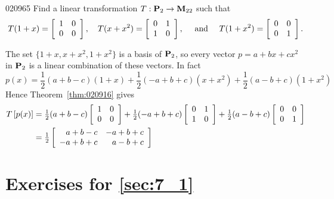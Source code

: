 \begin{example}{}{020965}
Find a linear transformation $T : \textbf{P}_{2} \to \textbf{M}_{22}$ such that
\begin{equation*}
T(1 + x) = \left[ \begin{array}{rr}
1 & 0 \\
0 & 0
\end{array} \right], \quad
T(x + x^2) = \left[ \begin{array}{rr}
0 & 1 \\
1 & 0
\end{array} \right], \quad \mbox{ and } \quad
T(1 + x^2) = \left[ \begin{array}{rr}
0 & 0 \\
0 & 1
\end{array} \right].
\end{equation*}
\vspace*{-1em}
\begin{solution}
 The set $\{1 + x, x + x^{2}, 1 + x^{2}\}$ is a basis of $\textbf{P}_{2}$, so every vector $p = a + bx + cx^{2}$ in $\textbf{P}_{2}$ is a linear combination of these vectors. In fact
\begin{equation*}
p(x) = \frac{1}{2}(a + b - c)(1 + x) + \frac{1}{2}(-a + b + c)(x + x^2) + \frac{1}{2}(a - b + c)(1 + x^2)
\end{equation*}
Hence Theorem~\ref{thm:020916} gives
\begin{align*}
T\left[p(x)\right] &= \tfrac{1}{2}(a + b - c)\left[ \begin{array}{rr}
1 & 0 \\
0 & 0
\end{array} \right] + \tfrac{1}{2}(-a + b + c)\left[ \begin{array}{rr}
0 & 1 \\
1 & 0
\end{array} \right] + \tfrac{1}{2}(a - b + c)\left[ \begin{array}{rr}
0 & 0 \\
0 & 1
\end{array} \right] \\
&= \tfrac{1}{2} \left[ \begin{array}{rr}
a + b - c & -a + b + c \\
-a + b + c & a - b + c
\end{array} \right]
\end{align*}
\end{solution}
\end{example}

\section*{Exercises for \ref{sec:7_1}}

